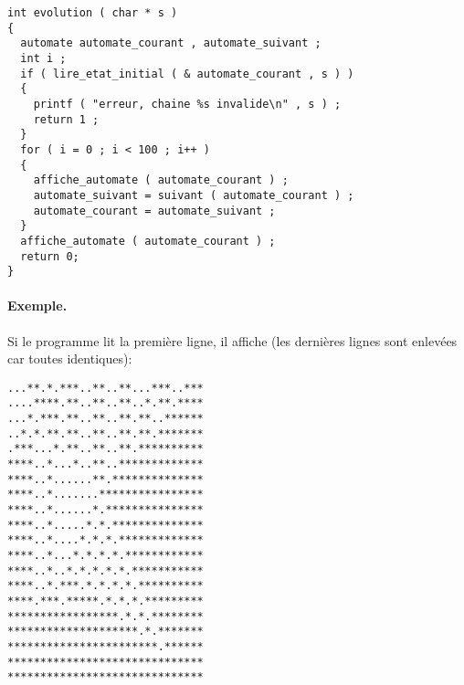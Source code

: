 \begin{solution}
  \begin{lstlisting}
int evolution ( char * s )
{
  automate automate_courant , automate_suivant ;
  int i ;
  if ( lire_etat_initial ( & automate_courant , s ) )
  {
    printf ( "erreur, chaine %s invalide\n" , s ) ;
    return 1 ;
  }
  for ( i = 0 ; i < 100 ; i++ )
  {
    affiche_automate ( automate_courant ) ;
    automate_suivant = suivant ( automate_courant ) ;
    automate_courant = automate_suivant ;
  }
  affiche_automate ( automate_courant ) ;
  return 0; 
}
  \end{lstlisting}
\end{solution}

\paragraph{Exemple.} Si le programme lit la première ligne, il affiche
(les derni{\`e}res lignes sont enlev{\'e}es car toutes identiques):

\begin{verbatim}
...**.*.***..**..**...***..***
....****.**..**..**..*.**.****
...*.***.**..**..**.**..******
..*.*.**.**..**..**.**.*******
.***...*.**..**..**.**********
****..*...*..**..*************
****..*......**.**************
****..*.......****************
****..*......*.***************
****..*.....*.*.**************
****..*....*.*.*.*************
****..*...*.*.*.*.************
****..*..*.*.*.*.*.***********
****..*.***.*.*.*.*.**********
****.***.*****.*.*.*.*********
*****************.*.*.********
********************.*.*******
***********************.******
******************************
******************************
\end{verbatim}





